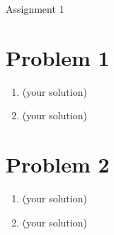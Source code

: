 \documentclass[11pt]{article}
\begin{document}


\begin{center}
{\Large Assignment 1}
\end{center}


\section*{Problem 1}

\begin{enumerate}[label=(\alph*)]
  \item (your solution)
  \item (your solution)
\end{enumerate}

\clearpage

\section*{Problem 2}

\begin{enumerate}[label=(\alph*)]
  \item (your solution)
  \item (your solution)
\end{enumerate}

\clearpage
\end{document}
